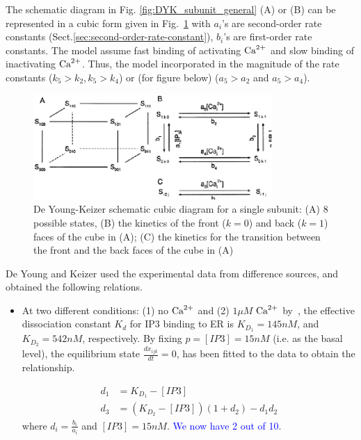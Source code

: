 The schematic diagram in Fig. \ref{fig:DYK_subunit_general} (A) or (B) can be
represented in a cubic form given in Fig.~\ref{fig:DeYoung-Keizer_diagram} with
$a_i$'s are second-order rate constants
(Sect.\ref{sec:second-order-rate-constant}), $b_i$'s are first-order rate
constants. The model assume fast binding of activating ${\text{Ca}^{2+}}$ and slow binding of
inactivating  ${\text{Ca}^{2+}}$. Thus, the model incorporated in the magnitude of the rate
constants ($k_5>k_2, k_5>k_4$) or (for figure below) ($a_5>a_2$ and $a_5>a_4$).

\begin{figure}[hbt]
 \centerline{\includegraphics[height=4cm]{./images/DeYoung-Keizer_diagram.eps}}
\caption{De Young-Keizer schematic cubic diagram for a single subunit: (A) 8
possible states, (B) the kinetics of the front ($k=0$) and back ($k=1$) faces
of the cube in (A); (C) the kinetics for the transition between the front
and the back faces of the cube in (A)}
\label{fig:DeYoung-Keizer_diagram}
\end{figure}


De Young and Keizer used the experimental data from difference sources, and
obtained the following relations.
\begin{itemize}
\item At two different conditions: (1) no ${\text{Ca}^{2+}}$ and (2) $1\mu M$
  ${\text{Ca}^{2+}}$ by~\cite{joseph1989ip3}, the
  effective dissociation constant $K_d$ for IP3 binding to ER is
  $K_{D_1} = 145nM$, and $K_{D_2}=542nM$, respectively. By fixing
  $p=[IP3]=15nM$ (i.e. as the basal level), the equilibrium state
  $\frac{dx_{ijk}}{dt}=0$, has been fitted to the data to obtain the
  relationship.

\begin{equation}
  \label{eq:343}
  \begin{split}
    d_1 &= K_{D_1} - [IP3]\\
    d_3 &= (K_{D_2} - [IP3])(1+d_2) - d_1d_2
  \end{split}
\end{equation}
where $d_i = \frac{b_i}{a_i}$ and $[IP3] = 15 nM$. \textcolor{blue}{We
  now have 2 out of 10}.


\end{itemize}


